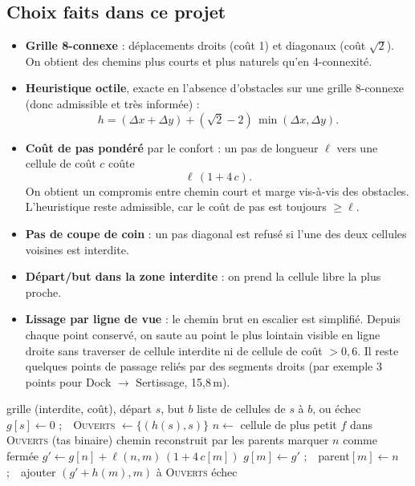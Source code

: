 \documentclass[11pt,a4paper]{article}
\begin{document}
\subsection{Choix faits dans ce projet}
\begin{itemize}
  \item \textbf{Grille 8-connexe} : déplacements droits (coût 1) et diagonaux (coût $\sqrt2$).
        On obtient des chemins plus courts et plus naturels qu'en 4-connexité.
  \item \textbf{Heuristique octile}, exacte en l'absence d'obstacles sur une grille 8-connexe
        (donc admissible et très informée) :
        \begin{equation}
          h = (\Delta x + \Delta y) + (\sqrt2 - 2)\,\min(\Delta x, \Delta y).
        \end{equation}
  \item \textbf{Coût de pas pondéré} par le confort : un pas de longueur $\ell$ vers une cellule de
        coût $c$ coûte
        \begin{equation}
          \ell\,(1 + 4\,c).
        \end{equation}
        On obtient un compromis entre chemin court et marge vis-à-vis des obstacles.
        L'heuristique reste admissible, car le coût de pas est toujours $\geq \ell$.
  \item \textbf{Pas de coupe de coin} : un pas diagonal est refusé si l'une des deux cellules
        voisines est interdite.
  \item \textbf{Départ/but dans la zone interdite} : on prend la cellule libre la plus proche.
  \item \textbf{Lissage par ligne de vue} : le chemin brut en escalier est simplifié. Depuis chaque
        point conservé, on saute au point le plus lointain visible en ligne droite sans traverser de
        cellule interdite ni de cellule de coût $> 0{,}6$. Il reste quelques points de passage
        reliés par des segments droits (par exemple 3 points pour Dock $\rightarrow$ Sertissage,
        15,8\,m).
\end{itemize}

\begin{algorithm}[h]
\caption{A* sur la grille (avec coût de confort)}
\begin{algorithmic}[1]
\Require grille (interdite, coût), départ $s$, but $b$
\Ensure liste de cellules de $s$ à $b$, ou échec
\State $g[s] \gets 0$ ;\ \ \textsc{Ouverts} $\gets \{(h(s), s)\}$
  \State $n \gets$ cellule de plus petit $f$ dans \textsc{Ouverts} (tas binaire)
   \Return chemin reconstruit par les parents \EndIf
  \State marquer $n$ comme fermée
     \State $g' \gets g[n] + \ell(n,m)\,(1 + 4\,c[m])$
        \State $g[m] \gets g'$ ;\ \ parent$[m] \gets n$ ;\ \ ajouter $(g' + h(m), m)$ à \textsc{Ouverts}
     \EndIf
  \EndFor
\EndWhile
\State \Return échec
\end{algorithmic}
\end{algorithm}
\end{document}
